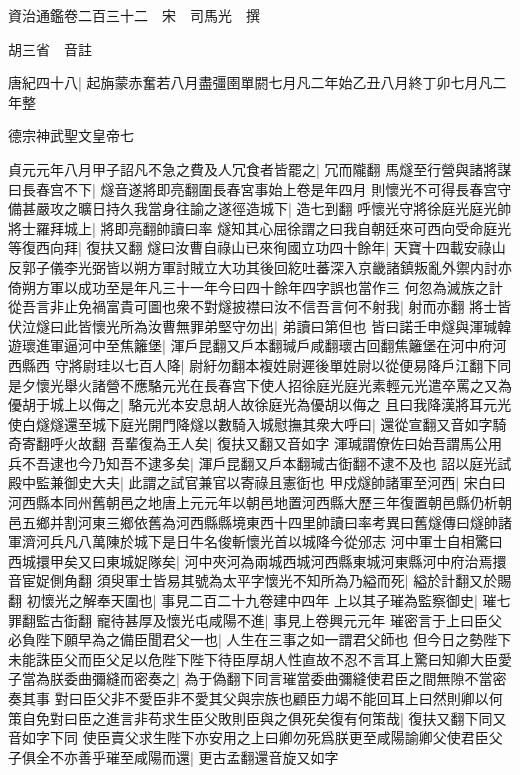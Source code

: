 資治通鑑卷二百三十二　宋　司馬光　撰

胡三省　音註

唐紀四十八|{
	起旃蒙赤奮若八月盡彊圉單閼七月凡二年始乙丑八月終丁卯七月凡二年整}


德宗神武聖文皇帝七

貞元元年八月甲子詔凡不急之費及人冗食者皆罷之|{
	冗而隴翻}
馬燧至行營與諸將謀曰長春宫不下|{
	燧音遂將即亮翻圍長春宮事始上卷是年四月}
則懷光不可得長春宫守備甚嚴攻之曠日持久我當身往諭之遂徑造城下|{
	造七到翻}
呼懷光守將徐庭光庭光帥將士羅拜城上|{
	將即亮翻帥讀曰率}
燧知其心屈徐謂之曰我自朝廷來可西向受命庭光等復西向拜|{
	復扶又翻}
燧曰汝曹自祿山已來徇國立功四十餘年|{
	天寶十四載安祿山反郭子儀李光弼皆以朔方軍討賊立大功其後回紇吐蕃深入京畿諸鎮叛亂外禦内討亦倚朔方軍以成功至是年凡三十一年今曰四十餘年四字誤也當作三}
何忽為滅族之計從吾言非止免禍富貴可圖也衆不對燧披襟曰汝不信吾言何不射我|{
	射而亦翻}
將士皆伏泣燧曰此皆懷光所為汝曹無罪弟堅守勿出|{
	弟讀曰第但也}
皆曰諾壬申燧與渾瑊韓遊瓌進軍逼河中至焦籬堡|{
	渾戶昆翻又戶本翻瑊戶咸翻瓌古回翻焦籬堡在河中府河西縣西}
守將尉珪以七百人降|{
	尉紆勿翻本複姓尉遲後單姓尉以從便易降戶江翻下同}
是夕懷光舉火諸營不應駱元光在長春宫下使人招徐庭光庭光素輕元光遣卒罵之又為優胡于城上以侮之|{
	駱元光本安息胡人故徐庭光為優胡以侮之}
且曰我降漢將耳元光使白燧燧還至城下庭光開門降燧以數騎入城慰撫其衆大呼曰|{
	還從宣翻又音如字騎奇寄翻呼火故翻}
吾輩復為王人矣|{
	復扶又翻又音如字}
渾瑊謂僚佐曰始吾謂馬公用兵不吾逮也今乃知吾不逮多矣|{
	渾戶昆翻又戶本翻瑊古衘翻不逮不及也}
詔以庭光試殿中監兼御史大夫|{
	此謂之試官兼官以寄祿且憲衘也}
甲戍燧帥諸軍至河西|{
	宋白曰河西縣本同州舊朝邑之地唐上元元年以朝邑地置河西縣大歷三年復置朝邑縣仍析朝邑五鄉并割河東三鄉依舊為河西縣縣境東西十四里帥讀曰率考異曰舊燧傳曰燧帥諸軍濟河兵凡八萬陳於城下是日牛名俊斬懷光首以城降今從邠志}
河中軍士自相驚曰西城擐甲矣又曰東城娖隊矣|{
	河中夾河為兩城西城河西縣東城河東縣河中府治焉擐音宦娖側角翻}
須臾軍士皆易其號為太平字懷光不知所為乃縊而死|{
	縊於計翻又於賜翻}
初懷光之解奉天圍也|{
	事見二百二十九卷建中四年}
上以其子璀為監察御史|{
	璀七罪翻監古衘翻}
寵待甚厚及懷光屯咸陽不進|{
	事見上卷興元元年}
璀密言于上曰臣父必負陛下願早為之備臣聞君父一也|{
	人生在三事之如一謂君父師也}
但今日之勢陛下未能誅臣父而臣父足以危陛下陛下待臣厚胡人性直故不忍不言耳上驚曰知卿大臣愛子當為朕委曲彌縫而密奏之|{
	為于偽翻下同言璀當委曲彌縫使君臣之間無隙不當密奏其事}
對曰臣父非不愛臣非不愛其父與宗族也顧臣力竭不能回耳上曰然則卿以何策自免對曰臣之進言非苟求生臣父敗則臣與之俱死矣復有何策哉|{
	復扶又翻下同又音如字下同}
使臣賣父求生陛下亦安用之上曰卿勿死爲朕更至咸陽諭卿父使君臣父子俱全不亦善乎璀至咸陽而還|{
	更古孟翻還音旋又如字}
